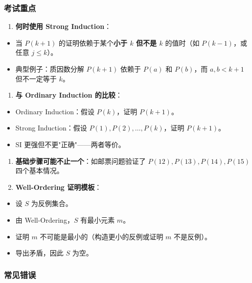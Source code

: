 \documentclass[10pt,a4paper,openany]{ctexbook}
\theoremstyle{definition}
\theoremstyle{remark}
\begin{document}
\subsubsection{考试重点}

\begin{enumerate}
\item \textbf{何时使用 Strong Induction}：
\end{enumerate}

\begin{itemize}
\item 当 $P(k+1)$ 的证明依赖于某个\textbf{小于 $k$ 但不是 $k$} 的值时（如 $P(k-1)$，或任意 $j \le k$）。
\item 典型例子：质因数分解 $P(k+1)$ 依赖于 $P(a)$ 和 $P(b)$，而 $a, b < k+1$ 但不一定等于 $k$。

\end{itemize}

\begin{enumerate}
\item \textbf{与 Ordinary Induction 的比较}：
\end{enumerate}

\begin{itemize}
\item Ordinary Induction：假设 $P(k)$，证明 $P(k+1)$。
\item Strong Induction：假设 $P(1), P(2), \dots, P(k)$，证明 $P(k+1)$。
\item SI 更强但不更"正确"——两者等价。

\end{itemize}

\begin{enumerate}
\item \textbf{基础步骤可能不止一个}：如邮票问题验证了 $P(12), P(13), P(14), P(15)$ 四个基本情况。

\item \textbf{Well-Ordering 证明模板}：
\end{enumerate}

\begin{itemize}
\item 设 $S$ 为反例集合。
\item 由 Well-Ordering，$S$ 有最小元素 $m$。
\item 证明 $m$ 不可能是最小的（构造更小的反例或证明 $m$ 不是反例）。
\item 导出矛盾，因此 $S$ 为空。

\end{itemize}

\subsubsection{常见错误}
\end{document}
